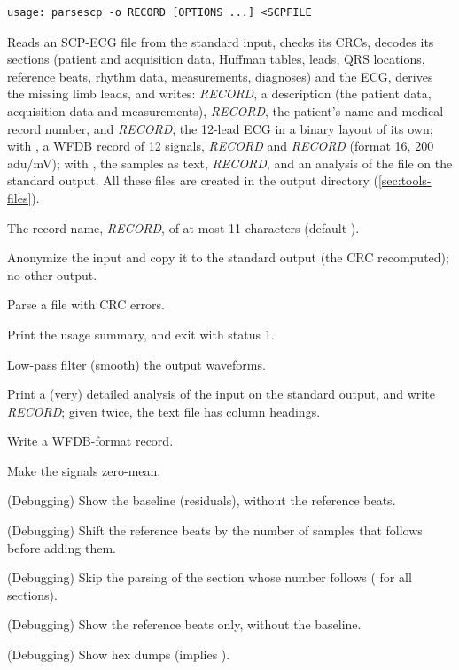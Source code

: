 \begin{lstlisting}[style=signature,language={}]
usage: parsescp -o RECORD [OPTIONS ...] <SCPFILE
\end{lstlisting}
Reads an SCP-ECG file from the standard input, checks its CRCs, decodes its sections
(patient and acquisition data, Huffman tables, leads, QRS locations, reference beats,
rhythm data, measurements, diagnoses) and the ECG, derives the missing limb leads, and
writes: \textit{RECORD}, a description (the patient data, acquisition data and
measurements), \textit{RECORD}, the patient's name and medical record number,
and \textit{RECORD}, the 12-lead ECG in a binary layout of its own; with
, a WFDB record of 12 signals, \textit{RECORD} and
\textit{RECORD} (format 16, 200\,adu/mV); with , the samples as text,
\textit{RECORD}, and an analysis of the file on the standard output. All these
files are created in the output directory (\cref{sec:tools-files}).
\begin{params}
\item[-o] The record name, \textit{RECORD}, of at most 11 characters (default ).
\item[-a] Anonymize the input and copy it to the standard output (the CRC recomputed);
  no other output.
\item[-f] Parse a file with CRC errors.
\item[-h] Print the usage summary, and exit with status 1.
\item[-l] Low-pass filter (smooth) the output waveforms.
\item[-v] Print a (very) detailed analysis of the input on the standard output, and write
  \textit{RECORD}; given twice, the text file has column headings.
\item[-w] Write a WFDB-format record.
\item[-z] Make the signals zero-mean.
\item[-b] (Debugging) Show the baseline (residuals), without the reference beats.
\item[-s] (Debugging) Shift the reference beats by the number of samples that follows
  before adding them.
\item[-S] (Debugging) Skip the parsing of the section whose number follows (\code{-} for
  all sections).
\item[-t] (Debugging) Show the reference beats only, without the baseline.
\item[-x] (Debugging) Show hex dumps (implies ).
\end{params}
